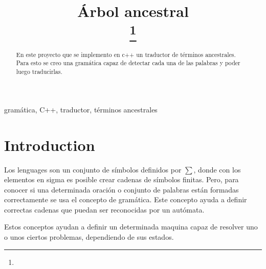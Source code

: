 \documentclass[conference]{IEEEtran}
\begin{document}
\title{\'Arbol ancestral \\
{\footnotesize \textsuperscript{}}
\thanks{}
}

\author{
\and
{}
\and
{}
}

\maketitle

\begin{abstract}
En este proyecto que se implemento en c++ un traductor de t\'erminos ancestrales. Para esto se creo una gram\'atica capaz de detectar cada una de las palabras y poder luego traducirlas. 

\end{abstract}

\begin{IEEEkeywords}
gram\'atica, C++, traductor, t\'erminos ancestrales 
\end{IEEEkeywords}

\section{Introduction}
Los lenguages son un conjunto de s\'imbolos definidos por $\sum$, 
donde con los elementos en sigma es posible crear cadenas de s\'imbolos finitas. Pero, para conocer si una determinada oraci\'on o conjunto de palabras est\'an formadas correctamente se usa el concepto de gram\'atica. Este concepto ayuda a definir correctas cadenas que puedan ser reconocidas por un aut\'omata. 

Estos conceptos ayudan a definir un determinada maquina capaz de resolver uno o unos ciertos problemas, dependiendo de sus estados.
\end{document}
